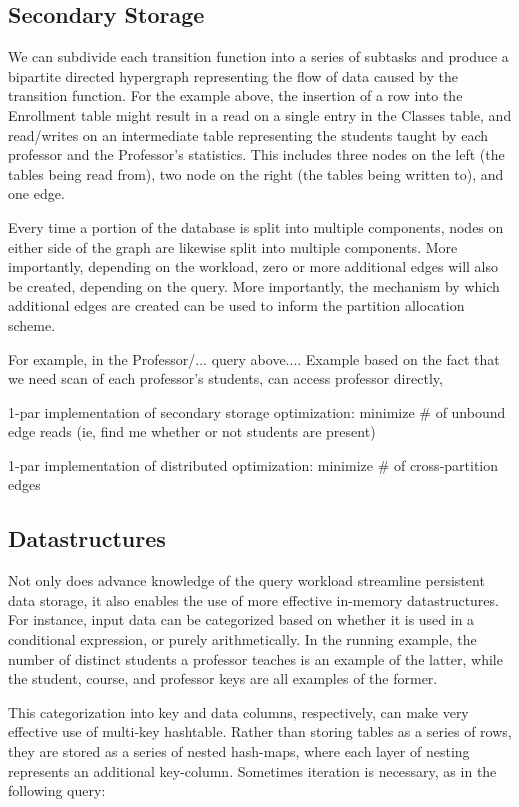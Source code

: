 \subsection{Secondary Storage}
We can subdivide each transition function into a series of subtasks and produce a bipartite directed hypergraph representing the flow of data caused by the transition function.  For the example above, the insertion of a row into the Enrollment table might result in a read on a single entry in the Classes table, and read/writes on an intermediate table representing the students taught by each professor and the Professor's statistics.  This includes three nodes on the left (the tables being read from), two node on the right (the tables being written to), and one edge.

Every time a portion of the database is split into multiple components, nodes on either side of the graph are likewise split into multiple components.  More importantly, depending on the workload, zero or more additional edges will also be created, depending on the query.  More importantly, the mechanism by which additional edges are created can be used to inform the partition allocation scheme.  

For example, in the Professor/... query above....  Example based on the fact that we need scan of each professor's students, can access professor directly, 

1-par implementation of secondary storage optimization: minimize \# of unbound
edge reads (ie, find me whether or not students are present)

1-par implementation of distributed optimization: minimize \# of cross-partition
edges

\subsection{Datastructures}
Not only does advance knowledge of the query workload streamline persistent data storage, it also enables the use of more effective in-memory datastructures.  For instance, input data can be categorized based on whether it is used in a conditional expression, or purely arithmetically.  In the running example, the number of distinct students a professor teaches is an example of the latter, while the student, course, and professor keys are all examples of the former.

This categorization into key and data columns, respectively, can make very effective use of multi-key hashtable.  Rather than storing tables as a series of rows, they are stored as a series of nested hash-maps, where each layer of nesting represents an additional key-column.  Sometimes iteration is necessary, as in the following query:

